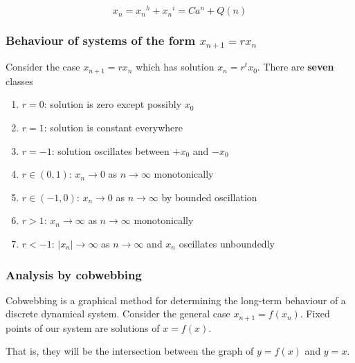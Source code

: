 \documentclass[11pt]{article}
\providecommand{\tightlist}{%
      \setlength{\itemsep}{0pt}\setlength{\parskip}{0pt}}
\begin{document}
\[x_n = {x_n}^h + {x_n}^i = Ca^n + Q(n)\]

\subsubsection{\texorpdfstring{Behaviour of systems of the form
\(x_{n+1} = rx_n\)}{Behaviour of systems of the form x\_\{n+1\} = rx\_n}}\label{behaviour-of-systems-of-the-form-xux5fn1-rxux5fn}

Consider the case \(x_{n+1} = rx_n\) which has solution
\(x_n = r^tx_0\). There are \textbf{seven} classes

\begin{enumerate}
\def\labelenumi{\arabic{enumi}.}
\tightlist
\item
  \(r = 0\): solution is zero except possibly \(x_0\)
\item
  \(r = 1\): solution is constant everywhere
\item
  \(r = -1\): solution oscillates between \(+x_0\) and \(-x_0\)
\item
  \(r \in (0, 1)\): \(x_n \to 0\) as \(n \to \infty\) monotonically
\item
  \(r \in (-1, 0)\): \(x_n \to 0\) as \(n \to \infty\) by bounded
  oscillation
\item
  \(r > 1\): \(x_n \to \infty\) as \(n \to \infty\) monotonically
\item
  \(r < -1\): \(|x_n| \to \infty\) as \(n \to \infty\) and \(x_n\)
  oscillates unboundedly
\end{enumerate}

\subsubsection{Analysis by cobwebbing}\label{analysis-by-cobwebbing}

Cobwebbing is a graphical method for determining the long-term behaviour
of a discrete dynamical system. Consider the general case
\(x_{n+1} = f(x_n)\). Fixed points of our system are solutions of
\(x = f(x)\).

That is, they will be the intersection between the graph of \(y = f(x)\)
and \(y = x\).
\end{document}
